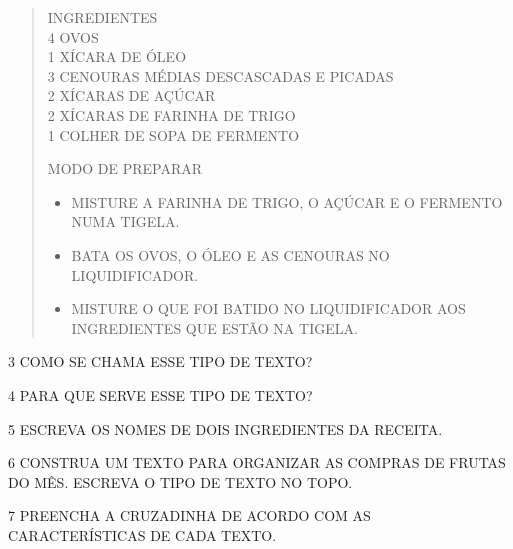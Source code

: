 \begin{quote}
\begin{flushleft}
INGREDIENTES\\
4 OVOS\\
1 XÍCARA DE ÓLEO\\
3 CENOURAS MÉDIAS DESCASCADAS E PICADAS\\
2 XÍCARAS DE AÇÚCAR\\
2 XÍCARAS DE FARINHA DE TRIGO\\
1 COLHER DE SOPA DE FERMENTO

MODO DE PREPARAR

\begin{itemize}
\item
  MISTURE A FARINHA DE TRIGO, O AÇÚCAR E O FERMENTO NUMA TIGELA.

\item
  BATA OS OVOS, O ÓLEO E AS CENOURAS NO LIQUIDIFICADOR.

\item
  MISTURE O QUE FOI BATIDO NO LIQUIDIFICADOR AOS INGREDIENTES QUE ESTÃO NA TIGELA.
\end{itemize}
\end{flushleft}

\end{quote}

\num{3} COMO SE CHAMA ESSE TIPO DE TEXTO?


\num{4} PARA QUE SERVE ESSE TIPO DE TEXTO?


\num{5} ESCREVA OS NOMES DE DOIS INGREDIENTES DA RECEITA.


\pagebreak
\num{6} CONSTRUA UM TEXTO PARA ORGANIZAR AS COMPRAS DE FRUTAS DO MÊS. ESCREVA O TIPO DE TEXTO NO TOPO.


\num{7} PREENCHA A CRUZADINHA DE ACORDO COM AS CARACTERÍSTICAS DE CADA TEXTO.

